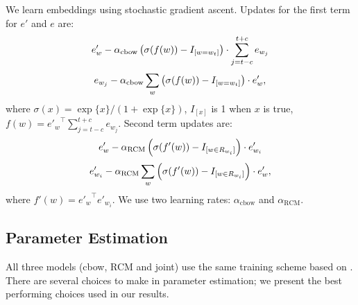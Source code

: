 \documentclass[11pt]{article}
\begin{document}
We learn embeddings using stochastic gradient ascent. Updates for the first term for $e'$
and $e$ are:
\vspace{-.3cm}
\begin{equation}
\small
e'_{w} - \alpha_{\textrm{cbow}} \left( \sigma(f(w)) - I_{[w=w_t]} \right)\cdot \sum_{j=t-c}^{t+c} e_{w_j} \nonumber
\end{equation}
\vspace{-.4cm}
\begin{equation}
\small
e_{w_j} - \alpha_{\textrm{cbow}} \sum_{w}  \left( \sigma(f(w)) - I_{[w=w_t]} \right)\cdot e'_{w}, \nonumber
\end{equation}
where $\sigma(x) = {\exp\{x\}}/{\left(1+\exp\{x\}\right)}$,
$I_{[x]}$ is 1 when $x$ is true, $f(w)={e'_w}^{\top} \sum_{j=t-c}^{t+c} e_{w_j}$. 
Second term updates are:
\vspace{-.2cm}
\begin{equation}
\small
e'_{w} - \alpha_{\textrm{RCM}} \left( \sigma(f'(w)) - I_{[w \in R_{w_i}]} \right)\cdot e'_{w_i} \nonumber
\end{equation}
\vspace{-.4cm}
\begin{equation}
\small
\vspace{-.1cm}
e'_{w_i} - \alpha_{\textrm{RCM}} \sum_{w}  \left( \sigma(f'(w)) - I_{[w \in R_{w_i}]} \right)\cdot e'_{w}, \nonumber
\end{equation}
where  $f'(w)={e'_w}^{\top}  e'_{w_i}$. We use two learning rates: $\alpha_{\textrm{cbow}}$ and $\alpha_{\textrm{RCM}}$.

\subsection{Parameter Estimation}
All three models (cbow, RCM and joint) use the same training scheme based on .
There are several choices to make in parameter estimation; we present the best performing choices used in our results.
\end{document}
